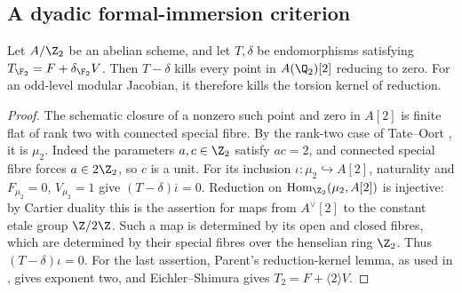 \subsection{A dyadic formal-immersion criterion}
\begin{lemma}\label{lem:nonic51-dyadic-Hecke}
Let $A/\Z_2$ be an abelian scheme, and let $T,\delta$ be
endomorphisms satisfying $T_{\F_2}=F+\delta_{\F_2}V$.
Then $T-\delta$ kills every point in $A(\Q_2)[2]$ reducing to zero.
For an odd-level modular Jacobian, it therefore kills the torsion
kernel of reduction.
\end{lemma}
\begin{proof}
The schematic closure of a nonzero such point and zero in $A[2]$
is finite flat of rank two with connected special fibre. By the
rank-two case of Tate--Oort \cite{TO}, it is $\mu_2$.
Indeed the parameters $a,c\in\Z_2$ satisfy $ac=2$, and connected
special fibre forces $a\in2\Z_2$, so $c$ is a unit.
For its inclusion $\iota:\mu_2\hookrightarrow A[2]$, naturality
and $F_{\mu_2}=0$, $V_{\mu_2}=1$ give
$(T-\delta)\overline\iota=0$.
Reduction on $\operatorname{Hom}_{\Z_2}(\mu_2,A[2])$ is injective:
by Cartier duality this is the assertion for maps from $A^\vee[2]$
to the constant etale group $\Z/2\Z$. Such a map is determined by
its open and closed fibres, which are determined by their special
fibres over the henselian ring $\Z_2$.
Thus $(T-\delta)\iota=0$.
For the last assertion, Parent's reduction-kernel lemma, as used
in \cite[Section~5]{DN}, gives exponent two, and Eichler--Shimura
gives $T_2=F+\langle2\rangle V$.
\end{proof}

